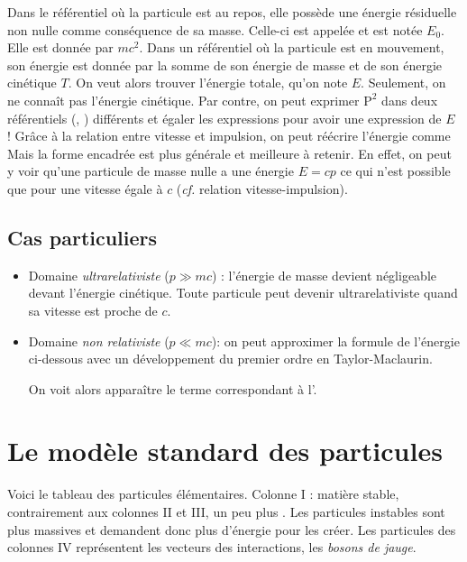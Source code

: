 \documentclass[11pt]{book}
\begin{document}
Dans le référentiel où la particule est au repos, elle possède une énergie résiduelle non nulle comme conséquence de sa masse. Celle-ci est appelée  et est notée $E_0$. Elle est donnée par $mc^2$. Dans un référentiel où la particule est en mouvement, son énergie est donnée par la somme de son énergie de masse et de son énergie cinétique $T$. On veut alors trouver l'énergie totale, qu'on note $E$. Seulement, on ne connaît pas l'énergie cinétique. Par contre, on peut exprimer $\mathrm{P}^2$ dans deux référentiels (, ) différents et égaler les expressions pour avoir une expression de $E$ !
Grâce à la relation entre vitesse et impulsion, on peut réécrire l'énergie comme 
Mais la forme encadrée est plus générale et meilleure à retenir. En effet, on peut y voir qu'une particule de masse nulle a une énergie $ E = cp$ ce qui n'est possible que pour une vitesse égale à $c$ (\textit{cf.} relation vitesse-impulsion).
\subsection{Cas particuliers}
\begin{itemize}
\item Domaine \textit{ultrarelativiste} ($p\gg mc$) : l'énergie de masse devient négligeable devant l'énergie cinétique. Toute particule peut devenir ultrarelativiste quand sa vitesse est proche de $c$.
\item Domaine \textit{non relativiste} ($p\ll mc$): on peut approximer la formule de l'énergie ci-dessous avec un développement du premier ordre en Taylor-Maclaurin.

On voit alors apparaître le terme correspondant à l'.
\end{itemize}
\section{Le modèle standard des particules}
Voici le tableau des particules élémentaires. Colonne I : matière stable, contrairement aux colonnes II et III, un peu plus . Les particules instables sont plus massives et demandent donc plus d'énergie pour les créer. Les particules des colonnes IV représentent les vecteurs des interactions, les \textit{bosons de jauge}. \\
\end{document}
